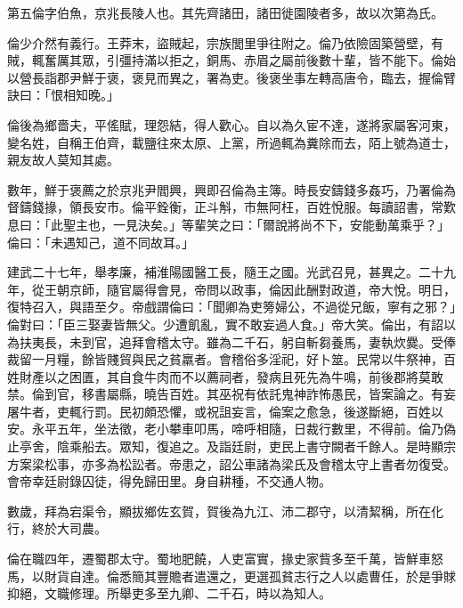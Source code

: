 
\begin{pinyinscope}
第五倫字伯魚，京兆長陵人也。其先齊諸田，諸田徙園陵者多，故以次第為氏。

倫少介然有義行。王莽末，盜賊起，宗族閭里爭往附之。倫乃依險固築營壁，有賊，輒奮厲其眾，引彊持滿以拒之，銅馬、赤眉之屬前後數十輩，皆不能下。倫始以營長詣郡尹鮮于褒，褒見而異之，署為吏。後褒坐事左轉高唐令，臨去，握倫臂訣曰：「恨相知晚。」

倫後為鄉嗇夫，平傜賦，理怨結，得人歡心。自以為久宦不達，遂將家屬客河東，變名姓，自稱王伯齊，載鹽往來太原、上黨，所過輒為糞除而去，陌上號為道士，親友故人莫知其處。

數年，鮮于褒薦之於京兆尹閻興，興即召倫為主簿。時長安鑄錢多姦巧，乃署倫為督鑄錢掾，領長安巿。倫平銓衡，正斗斛，巿無阿枉，百姓悅服。每讀詔書，常歎息曰：「此聖主也，一見決矣。」等輩笑之曰：「爾說將尚不下，安能動萬乘乎？」倫曰：「未遇知己，道不同故耳。」

建武二十七年，舉孝廉，補淮陽國醫工長，隨王之國。光武召見，甚異之。二十九年，從王朝京師，隨官屬得會見，帝問以政事，倫因此酬對政道，帝大悅。明日，復特召入，與語至夕。帝戲謂倫曰：「聞卿為吏篣婦公，不過從兄飯，寧有之邪？」倫對曰：「臣三娶妻皆無父。少遭飢亂，實不敢妄過人食。」帝大笑。倫出，有詔以為扶夷長，未到官，追拜會稽太守。雖為二千石，躬自斬芻養馬，妻執炊爨。受俸裁留一月糧，餘皆賤貿與民之貧羸者。會稽俗多淫祀，好卜筮。民常以牛祭神，百姓財產以之困匱，其自食牛肉而不以薦祠者，發病且死先為牛鳴，前後郡將莫敢禁。倫到官，移書屬縣，曉告百姓。其巫祝有依託鬼神詐怖愚民，皆案論之。有妄屠牛者，吏輒行罰。民初頗恐懼，或祝詛妄言，倫案之愈急，後遂斷絕，百姓以安。永平五年，坐法徵，老小攀車叩馬，啼呼相隨，日裁行數里，不得前。倫乃偽止亭舍，陰乘船去。眾知，復追之。及詣廷尉，吏民上書守闕者千餘人。是時顯宗方案梁松事，亦多為松訟者。帝患之，詔公車諸為梁氏及會稽太守上書者勿復受。會帝幸廷尉錄囚徒，得免歸田里。身自耕種，不交通人物。

數歲，拜為宕渠令，顯拔鄉佐玄賀，賀後為九江、沛二郡守，以清絜稱，所在化行，終於大司農。

倫在職四年，遷蜀郡太守。蜀地肥饒，人吏富實，掾史家貲多至千萬，皆鮮車怒馬，以財貨自達。倫悉簡其豐贍者遣還之，更選孤貧志行之人以處曹任，於是爭賕抑絕，文職修理。所舉吏多至九卿、二千石，時以為知人。


\end{pinyinscope}
